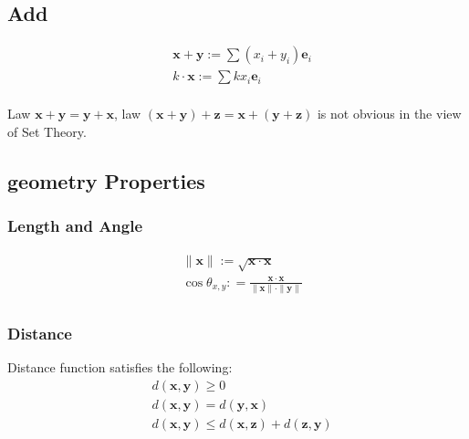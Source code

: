\documentclass[UTF8]{../../09-Mathematics}
\begin{document}
\subsection{Add}

\begin{equation}
    \begin{split}
    & \boldsymbol x + \boldsymbol y := \sum (x_i + y_i)\boldsymbol e_i\\
    & k \cdot \boldsymbol x := \sum kx_i\boldsymbol e_i\\
\end{split}
\end{equation}

Law $\boldsymbol{x} + \boldsymbol{y} = \boldsymbol{y} + \boldsymbol{x}$,
law $ (\boldsymbol{x} + \boldsymbol{y} )+ \boldsymbol{z} = \boldsymbol{x} +( \boldsymbol{y} + \boldsymbol{z})$ is not obvious in the view of Set Theory.


\subsection{geometry Properties}

\subsubsection{Length and Angle}

\begin{equation}
    \begin{split}
    &\parallel \boldsymbol{x} \parallel := \sqrt{\boldsymbol x \cdot \boldsymbol x}\\
    &\cos {\theta_{x,y}} : = \frac
    {\boldsymbol x \cdot \boldsymbol x}
    {\parallel \boldsymbol{x} \parallel \cdot \parallel \boldsymbol{y} \parallel}\\
\end{split}
\end{equation}


\subsubsection{Distance}

Distance function satisfies the following:
\begin{equation}\label{Defination:Distance_function}
    \begin{split}
    &d(\boldsymbol x, \boldsymbol y) \geqslant 0\\
    &d(\boldsymbol x, \boldsymbol y) = d(\boldsymbol y, \boldsymbol x)\\
    &d(\boldsymbol x, \boldsymbol y) \leqslant d(\boldsymbol x, \boldsymbol z) + d(\boldsymbol z, \boldsymbol y)\\
\end{split}
\end{equation}
\end{document}
